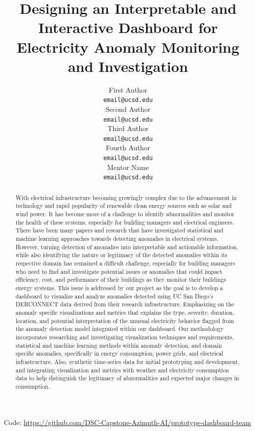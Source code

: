 \documentclass[12pt,letterpaper]{article}
\title{Designing an Interpretable and Interactive Dashboard for Electricity Anomaly Monitoring and Investigation}
\author{First Author \\
  {\tt email@ucsd.edu} \\\And
  Second Author \\
  {\tt email@ucsd.edu} \\\And
  Third Author \\
  {\tt email@ucsd.edu} \\\And
  Fourth Author \\
  {\tt email@ucsd.edu} \\\And
  Mentor Name \\
  {\tt email@ucsd.edu} \\}
\begin{document}
\maketitle


\begin{abstract}
With electrical infrastructure becoming growingly complex due to the advancement in technology and rapid popularity of renewable clean energy sources such as solar and wind power. It has become more of a challenge to identify abnormalities and monitor the health of these systems, especially for building managers and electrical engineers. There have been many papers and research that have investigated statistical and machine learning approaches towards detecting anomalies in electrical systems. However, turning detection of anomalies into interpretable and actionable information, while also identifying the nature or legitimacy of the detected anomalies within its respective domain has remained a difficult challenge, especially for building managers who need to find and investigate potential issues or anomalies that could impact efficiency, cost, and performance of their buildings as they monitor their buildings energy systems. This issue is addressed by our project as the goal is to develop a dashboard to visualize and analyze anomalies detected using UC San Diego's DERCONNECT data derived from their research infrastructure. Emphasizing on the anomaly specific visualizations and metrics that explains the type, severity, duration, location, and potential interpretation of the unusual electricity behavior flagged from the anomaly detection model integrated within our dashboard. Our methodology incorporates researching and investigating visualization techniques and requirements, statistical and machine learning methods within anomaly detection, and domain specific anomalies, specifically in energy consumption, power grids, and electrical infrastructure. Also, synthetic time-series data for initial prototyping and development, and integrating visualization and metrics with weather and electricity consumption data to help distinguish the legitimacy of abnormalities and expected major changes in consumption.
\end{abstract}

\begin{center}
Code: \url{https://github.com/DSC-Capstone-Azimuth-AI/prototype-dashboard-team}
\end{center}
\end{document}
